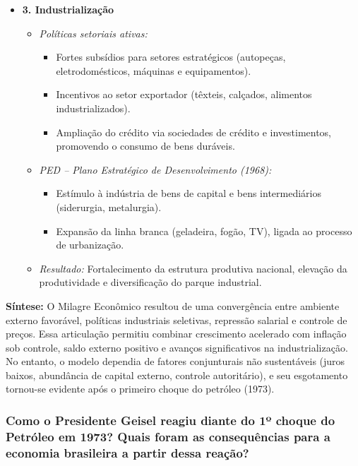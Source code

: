 \documentclass[a4paper,12pt]{article}[abntex2]
\begin{document}
\begin{itemize}
    \item \textbf{3. Industrialização}
    \begin{itemize}
        \item \textit{Políticas setoriais ativas:}
        \begin{itemize}
            \item Fortes subsídios para setores estratégicos (autopeças, eletrodomésticos, máquinas e equipamentos).
            \item Incentivos ao setor exportador (têxteis, calçados, alimentos industrializados).
            \item Ampliação do crédito via sociedades de crédito e investimentos, promovendo o consumo de bens duráveis.
        \end{itemize}
        \item \textit{PED – Plano Estratégico de Desenvolvimento (1968):}
        \begin{itemize}
            \item Estímulo à indústria de bens de capital e bens intermediários (siderurgia, metalurgia).
            \item Expansão da linha branca (geladeira, fogão, TV), ligada ao processo de urbanização.
        \end{itemize}
        \item \textit{Resultado:} Fortalecimento da estrutura produtiva nacional, elevação da produtividade e diversificação do parque industrial.
    \end{itemize}
\end{itemize}

\textbf{Síntese:} O Milagre Econômico resultou de uma convergência entre ambiente externo favorável, políticas industriais seletivas, repressão salarial e controle de preços. Essa articulação permitiu combinar crescimento acelerado com inflação sob controle, saldo externo positivo e avanços significativos na industrialização. No entanto, o modelo dependia de fatores conjunturais não sustentáveis (juros baixos, abundância de capital externo, controle autoritário), e seu esgotamento tornou-se evidente após o primeiro choque do petróleo (1973).

\subsubsection{\textbf{Como o Presidente Geisel reagiu diante do 1º choque do Petróleo em 1973? Quais foram as consequências para a economia brasileira a partir dessa reação?}}
\end{document}
